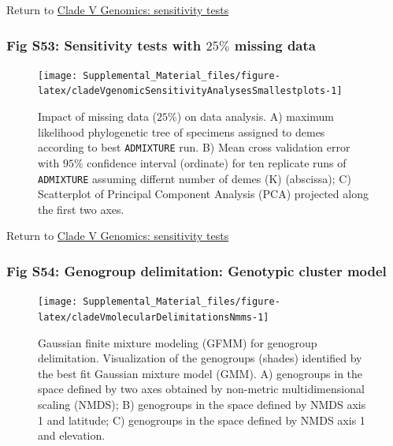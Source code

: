 \documentclass[
  11pt,
]{article}
\begin{document}
Return to \protect\hyperlink{sensitivity-tests-4}{Clade V Genomics: sensitivity tests}
\pagebreak

\hypertarget{fig-s53-sensitivity-tests-with-25-missing-data}{%
\subsubsection{\texorpdfstring{Fig S53: Sensitivity tests with \(25\%\) missing data}{Fig S53: Sensitivity tests with 25\textbackslash\% missing data}}\label{fig-s53-sensitivity-tests-with-25-missing-data}}

\begin{figure}
\texttt{[image: Supplemental\_Material\_files/figure-latex/cladeVgenomicSensitivityAnalysesSmallestplots-1]} \caption{Impact of missing data ($25\%$) on data analysis. A) maximum likelihood phylogenetic tree of specimens assigned to demes according to best \texttt{ADMIXTURE} run. B) Mean cross validation error with $95\%$ confidence interval (ordinate) for ten replicate runs of \texttt{ADMIXTURE} assuming differnt number of demes (K) (abscissa); C) Scatterplot of Principal Component Analysis (PCA) projected along the first two axes.}\label{fig:cladeVgenomicSensitivityAnalysesSmallestplots}
\end{figure}

Return to \protect\hyperlink{sensitivity-tests-4}{Clade V Genomics: sensitivity tests}
\pagebreak

\hypertarget{fig-s54-genogroup-delimitation-genotypic-cluster-model}{%
\subsubsection{Fig S54: Genogroup delimitation: Genotypic cluster model}\label{fig-s54-genogroup-delimitation-genotypic-cluster-model}}

\begin{figure}
\texttt{[image: Supplemental\_Material\_files/figure-latex/cladeVmolecularDelimitationsNmms-1]} \caption{Gaussian finite mixture modeling (GFMM) for genogroup delimitation. Visualization of the genogroups (shades) identified by the best fit Gaussian mixture model (GMM). A) genogroups in the space defined by two axes obtained by non-metric multidimensional scaling (NMDS); B) genogroups in the space defined by NMDS axis 1 and latitude; C) genogroups in the space defined by NMDS axis 1 and elevation.}\label{fig:cladeVmolecularDelimitationsNmms}
\end{figure}
\end{document}
